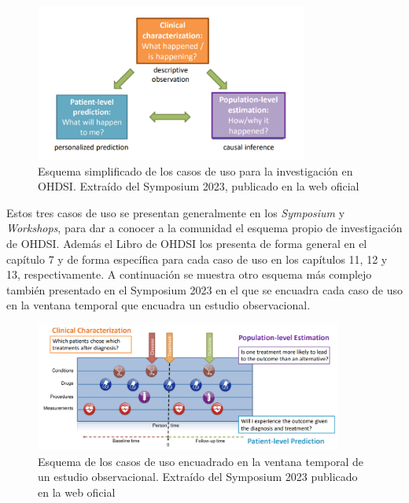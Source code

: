 \begin{figure}[H]
\centering
\includegraphics[width=0.80\textwidth]{figures/useCases.png}
     \caption{Esquema simplificado de los casos de uso para la investigación en OHDSI. Extraído del Symposium 2023, publicado en la web oficial \cite{OHDSIwebsite}}
    \label{fig:useCases}
\end{figure}

Estos tres casos de uso se presentan generalmente en los \textit{Symposium} y \textit{Workshops}, para dar a conocer a la comunidad el esquema propio de investigación de OHDSI. Además el Libro de OHDSI \cite{OHDSIbook} los presenta de forma general en el capítulo 7 y de forma específica para cada caso de uso en los capítulos 11, 12 y 13, respectivamente. A continuación se muestra otro esquema más complejo también presentado en el Symposium 2023 en el que se encuadra cada caso de uso en la ventana temporal que encuadra un estudio observacional.

\begin{figure}[H]
\centering
\includegraphics[width=0.90\textwidth]{figures/useCasesJourney.png}
     \caption{Esquema de los casos de uso encuadrado en la ventana temporal de un estudio observacional. Extraído del Symposium 2023 publicado en la web oficial \cite{OHDSIwebsite}}
    \label{fig:useCasesJourney}
\end{figure}


